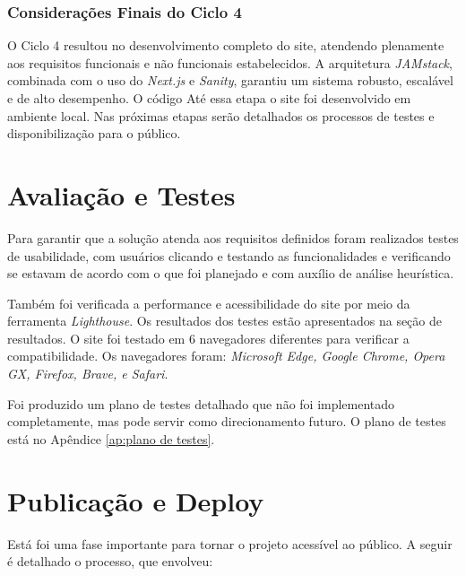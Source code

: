 \subsubsection*{Considerações Finais do Ciclo 4}
O Ciclo 4 resultou no desenvolvimento completo do site, atendendo plenamente aos requisitos funcionais e não funcionais estabelecidos. A arquitetura \textit{JAMstack}, combinada com o uso do \textit{Next.js} e \textit{Sanity}, garantiu um sistema robusto, escalável e de alto desempenho. O código Até essa etapa o site foi desenvolvido em ambiente local. Nas próximas etapas serão detalhados os processos de testes e disponibilização para o público.





\section{Avaliação e Testes}
\label{sec:avaliacao_testes}

Para garantir que a solução atenda aos requisitos definidos foram realizados testes de usabilidade, com usuários clicando e testando as funcionalidades e verificando se estavam de acordo com o que foi planejado e com auxílio de análise heurística.

Também foi verificada a performance e acessibilidade do site por meio da ferramenta \textit{Lighthouse}. Os resultados dos testes estão apresentados na seção de resultados.
O site foi testado em 6 navegadores diferentes para verificar a compatibilidade. Os navegadores foram: \textit{Microsoft Edge, Google Chrome, Opera GX, Firefox, Brave, e Safari}.

Foi produzido um plano de testes detalhado que não foi implementado completamente, mas pode servir como direcionamento futuro. O plano de testes está no Apêndice \ref{ap:plano de testes}.

\section{Publicação e Deploy}
\label{sec:publicacao_deploy}

Está foi uma fase importante para tornar o projeto acessível ao público. A seguir é detalhado o processo, que envolveu:

